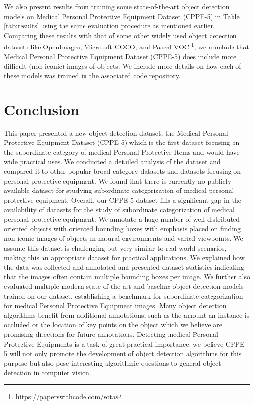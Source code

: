 \documentclass{article}
\begin{document}
We also present results from training some state-of-the-art object detection models on Medical Personal Protective Equipment Dataset (CPPE-5) in Table \ref{tab:results} using the same evaluation procedure as mentioned earlier. Comparing these results with that of some other widely used object detection datasets like OpenImages, Microsoft COCO, and Pascal VOC \footnote{https://paperswithcode.com/sota}, we conclude that Medical Personal Protective Equipment Dataset (CPPE-5) does include more difficult (non-iconic) images of objects. We include more details on how each of these models was trained in the associated code repository.

\section{Conclusion}
\label{Conclusion}

This paper presented a new object detection dataset, the Medical Personal Protective Equipment Dataset (CPPE-5) which is the first dataset focusing on the subordinate category of medical Personal Protective Items and would have wide practical uses. We conducted a detailed analysis of the dataset and compared it to other popular broad-category datasets and datasets focusing on personal protective equipment. We found that there is currently no publicly available dataset for studying subordinate categorization of medical personal protective equipment. Overall, our CPPE-5 dataset fills a significant gap in the availability of datasets for the study of subordinate categorization of medical personal protective equipment. We annotate a huge number of well-distributed oriented objects with oriented bounding boxes with emphasis placed on finding non-iconic images of objects in natural environments and varied viewpoints. We assume this dataset is challenging but very similar to real-world scenarios, making this an appropriate dataset for practical applications. We explained how the data was collected and annotated and presented dataset statistics indicating that the images often contain multiple bounding boxes per image. We further also evaluated multiple modern state-of-the-art and baseline object detection models trained on our dataset, establishing a benchmark for subordinate categorization for medical Personal Protective Equipment images. Many object detection algorithms benefit from additional annotations, such as the amount an instance is occluded or the location of key points on the object which we believe are promising directions for future annotations. Detecting medical Personal Protective Equipments is a task of great practical importance, we believe CPPE-5 will not only promote the development of object detection algorithms for this purpose but also pose interesting algorithmic questions to general object detection in computer vision.
\end{document}
